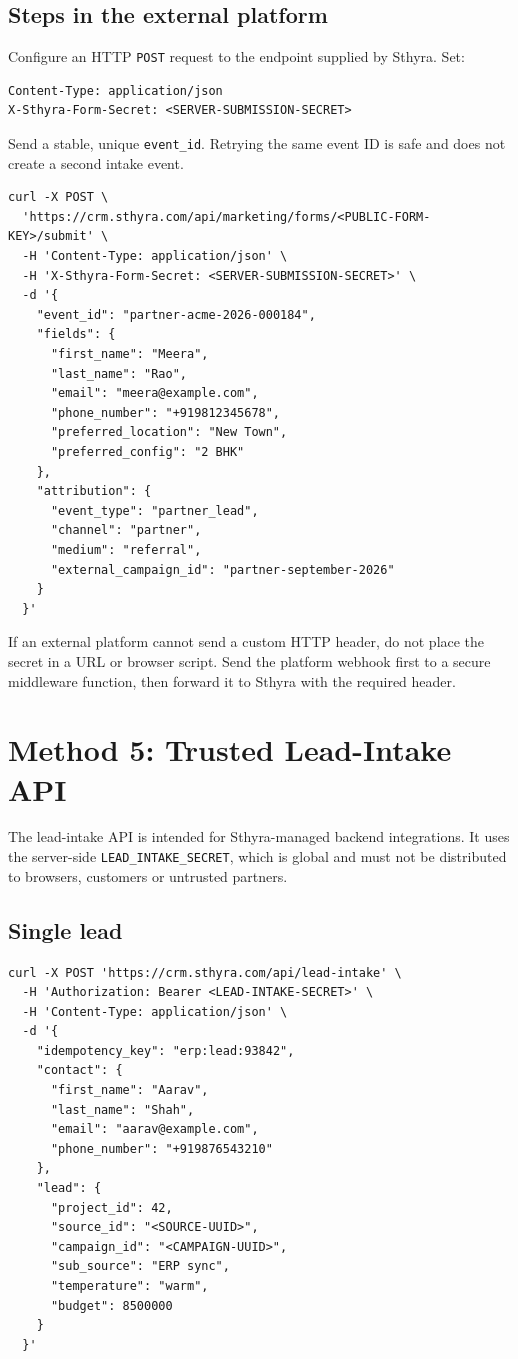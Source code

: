 \documentclass[11pt,a4paper]{article}
\newcommand{\code}[1]{\texttt{#1}}
\begin{document}
\subsection{Steps in the external platform}

Configure an HTTP \code{POST} request to the endpoint supplied by Sthyra. Set:

\begin{lstlisting}
Content-Type: application/json
X-Sthyra-Form-Secret: <SERVER-SUBMISSION-SECRET>
\end{lstlisting}

Send a stable, unique \code{event\_id}. Retrying the same event ID is safe and does not create a second intake event.

\begin{lstlisting}
curl -X POST \
  'https://crm.sthyra.com/api/marketing/forms/<PUBLIC-FORM-KEY>/submit' \
  -H 'Content-Type: application/json' \
  -H 'X-Sthyra-Form-Secret: <SERVER-SUBMISSION-SECRET>' \
  -d '{
    "event_id": "partner-acme-2026-000184",
    "fields": {
      "first_name": "Meera",
      "last_name": "Rao",
      "email": "meera@example.com",
      "phone_number": "+919812345678",
      "preferred_location": "New Town",
      "preferred_config": "2 BHK"
    },
    "attribution": {
      "event_type": "partner_lead",
      "channel": "partner",
      "medium": "referral",
      "external_campaign_id": "partner-september-2026"
    }
  }'
\end{lstlisting}

If an external platform cannot send a custom HTTP header, do not place the secret in a URL or browser script. Send the platform webhook first to a secure middleware function, then forward it to Sthyra with the required header.

\section{Method 5: Trusted Lead-Intake API}

The lead-intake API is intended for Sthyra-managed backend integrations. It uses the server-side \code{LEAD\_INTAKE\_SECRET}, which is global and must not be distributed to browsers, customers or untrusted partners.

\subsection{Single lead}

\begin{lstlisting}
curl -X POST 'https://crm.sthyra.com/api/lead-intake' \
  -H 'Authorization: Bearer <LEAD-INTAKE-SECRET>' \
  -H 'Content-Type: application/json' \
  -d '{
    "idempotency_key": "erp:lead:93842",
    "contact": {
      "first_name": "Aarav",
      "last_name": "Shah",
      "email": "aarav@example.com",
      "phone_number": "+919876543210"
    },
    "lead": {
      "project_id": 42,
      "source_id": "<SOURCE-UUID>",
      "campaign_id": "<CAMPAIGN-UUID>",
      "sub_source": "ERP sync",
      "temperature": "warm",
      "budget": 8500000
    }
  }'
\end{lstlisting}
\end{document}

